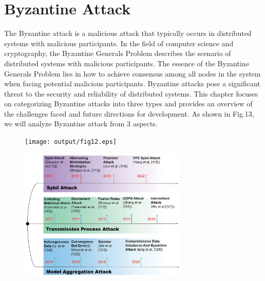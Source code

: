 \section{Byzantine Attack}  
The Byzantine attack is a malicious attack that
typically occurs in distributed systems with malicious
participants. In the field of computer science and cryptography,
the Byzantine Generals Problem describes the scenario
of distributed systems with malicious participants. The
essence of the Byzantine Generals Problem lies in how
to achieve consensus among all nodes in the system
when facing potential malicious participants. Byzantine
attacks pose a significant threat to the security and
reliability of distributed systems. This chapter focuses
on categorizing Byzantine attacks into three types and
provides an overview of the challenges faced and future
directions for development. As shown in Fig.13, we will
analyze Byzantine attack from 3 aspects.  

\begin{figure}[htbp]
	\centering
	\begin{minipage}{0.49\linewidth}
		\centering
		\texttt{[image: output/fig12.eps]}
		\caption{}
		\label{fig12}
	\end{minipage}
	\begin{minipage}{0.49\linewidth}
		\centering
		\includegraphics[width=1.0\linewidth,height=2.5in]{output/fig13.eps}
		\caption{}
		\label{fig13}
	\end{minipage}
\end{figure}



